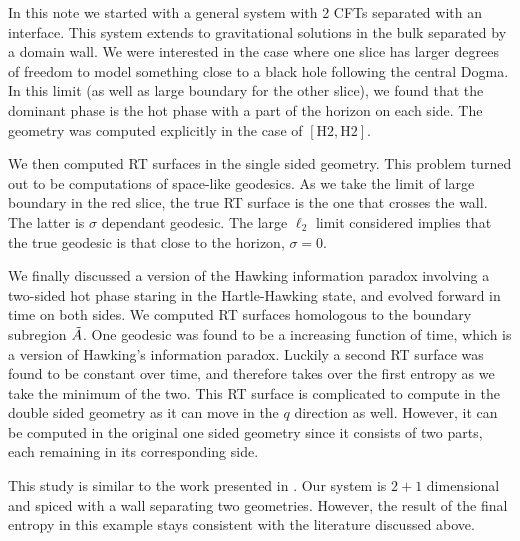 In this note we started with a general system with 2 CFTs separated with an interface. This system extends to gravitational solutions in the bulk separated by a domain wall. We were interested in the case where one slice has larger degrees of freedom to model something close to a black hole following the central Dogma. In this limit (as well as large boundary for the other slice), we found that the dominant phase is the hot phase with a part of the horizon on each side. The geometry was computed explicitly in the case of $[\text{H}2,\text{H}2]$. 

We then computed RT surfaces in the single sided geometry. This problem turned out to be computations of space-like geodesics. As we take the limit of large boundary in the red slice, the true RT surface is the one that crosses the wall. The latter is $\sigma$ dependant geodesic. The large $\ell_2$ limit considered implies that the true geodesic is that close to the horizon, $\sigma=0$.

We finally discussed a version of the Hawking information paradox involving a two-sided hot phase staring in the Hartle-Hawking state, and evolved forward in time on both sides. We computed RT surfaces homologous to the boundary subregion $\Tilde{A}$. One geodesic was found to be a increasing function of time, which is a version of Hawking's information paradox. Luckily a second RT surface was found to be constant over time, and therefore takes over the first entropy as we take the minimum of the two. This RT surface is complicated to compute in the double sided geometry as it can move in the $q$ direction as well. However, it can be computed in the original one sided geometry since it consists of two parts, each remaining in its corresponding side.

This study is similar to the work presented in \cite{almheiri2019islands}. Our system is $2+1$ dimensional and spiced with a wall separating two geometries. However, the result of the final entropy in this example stays consistent with the literature discussed above.